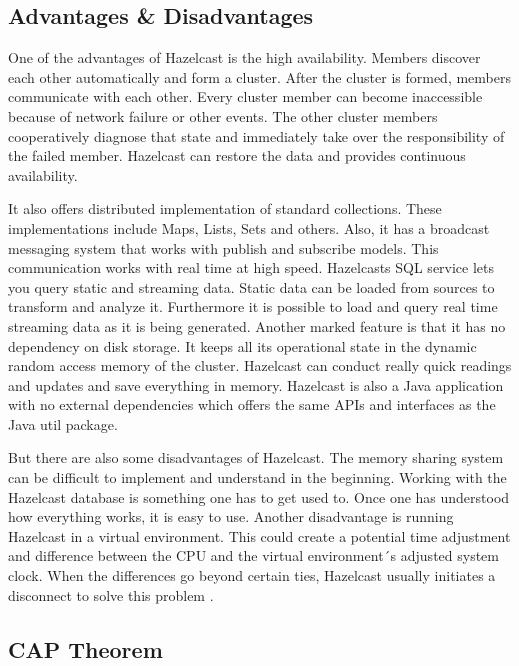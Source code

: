 \subsection{Advantages \& Disadvantages} \label{subsec:advantagesDisadvantagesHazelcast}

One of the advantages of Hazelcast is the high availability. Members discover each other automatically and form a cluster.
After the cluster is formed, members communicate with each other.  Every cluster member can become inaccessible because of network
failure or other events. The other cluster members cooperatively diagnose that state and immediately take over the responsibility of the failed member. Hazelcast can restore the data and provides continuous availability.

It also offers distributed implementation of standard collections. These implementations include Maps, Lists, Sets and others. Also,
it has a broadcast messaging system that works with publish and subscribe models. This communication works with real time at high speed.
Hazelcasts SQL service lets you query static and streaming data. Static data can be loaded from sources to transform and analyze it.
Furthermore it is possible to load and query real time streaming data as it is being generated.
Another marked feature is that it has no dependency on disk storage. It keeps all its operational state in the dynamic random access
memory of the cluster. Hazelcast can conduct really quick readings and updates and save everything in memory.
Hazelcast is also a Java application with no external dependencies which offers the same APIs and interfaces as the Java util package.

But there are also some disadvantages of Hazelcast. The memory sharing system can be difficult to implement and understand in the
beginning. Working with the Hazelcast database is something one has to get used to. Once one has understood how everything works, it is easy to use.
Another disadvantage is running Hazelcast in a virtual environment. This could create a potential time adjustment and difference
between the CPU and the virtual environment´s adjusted system clock. When the differences go beyond certain ties, Hazelcast usually
initiates a disconnect to solve this problem \parencite{Oguejiofor.05.10.2022}.

\subsection{CAP Theorem} \label{subsec:capTheoremHazelcast}

